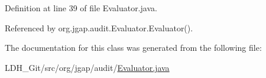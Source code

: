 Definition at line 39 of file Evaluator.\-java.



Referenced by org.\-jgap.\-audit.\-Evaluator.\-Evaluator().



The documentation for this class was generated from the following file\-:\begin{DoxyCompactItemize}
\item 
L\-D\-H\-\_\-\-Git/src/org/jgap/audit/\hyperlink{_evaluator_8java}{Evaluator.\-java}\end{DoxyCompactItemize}
